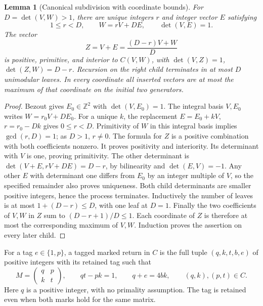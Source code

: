 \documentclass[11pt]{article}
\newtheorem{lemma}[theorem]{Lemma}
\theoremstyle{definition}\newtheorem{definition}[theorem]{Definition}
\theoremstyle{remark}\newtheorem{remark}[theorem]{Remark}
\newcommand{\Z}{\mathbb Z}\newcommand{\Q}{\mathbb Q}
\begin{document}
\begin{lemma}[Canonical subdivision with coordinate bounds]\label{lem:split}
For \(D=\det(V,W)>1\), there are unique integers \(r\) and
integer vector \(E\) satisfying
\[
 1\le r<D,\qquad W=rV+DE,\qquad\det(V,E)=1.
\]
The vector
\[
 Z=V+E=\frac{(D-r)V+W}{D}
\]
is positive, primitive, and interior to \(C(V,W)\), with
\(\det(V,Z)=1\), \(\det(Z,W)=D-r\).
Recursion on the right child terminates in at most \(D\)
unimodular leaves.  In every coordinate all inserted vectors
are at most the maximum of that coordinate on the initial
two generators.
\end{lemma}
\begin{proof}
Bezout gives \(E_0\in\Z^2\) with \(\det(V,E_0)=1\).
The integral basis \(V,E_0\) writes \(W=r_0 V+D E_0\).
For a unique \(k\), the replacement \(E=E_0+kV\),
\(r=r_0-Dk\) gives \(0\le r<D\).
Primitivity of \(W\) in this integral basis implies
\(\gcd(r,D)=1\); as \(D>1\), \(r\ne0\).
The formula for \(Z\) is a positive combination with both
coefficients nonzero.  It proves positivity and interiority.
Its determinant with \(V\) is one, proving primitivity.
The other determinant is
\(\det(V+E,rV+DE)=D-r\), by bilinearity and
\(\det(E,V)=-1\).
Any other \(E\) with determinant one differs from \(E_0\)
by an integer multiple of \(V\), so the specified remainder
also proves uniqueness.  Both child determinants are
smaller positive integers, hence the process terminates.
Inductively the number of leaves is at most
\(1+(D-r)\le D\), with one leaf at \(D=1\).
Finally the two coefficients of \(V,W\) in \(Z\) sum to
\((D-r+1)/D\le1\).  Each coordinate of \(Z\) is therefore
at most the corresponding maximum of \(V,W\).  Induction
proves the assertion on every later child.
\end{proof}

For a tag \(e\in\{1,p\}\), a tagged marked return in \(C\)
is the full tuple \((q,k,t,b,e)\) of positive integers
with its retained tag such that
\begin{equation}\label{eq:marked-return}
 M=\begin{pmatrix}q&p\\k&t\end{pmatrix},\qquad
 qt-pk=1,\qquad q+e=4bk,\qquad (q,k),(p,t)\in C .
\end{equation}
Here \(q\) is a positive integer, with no primality
assumption.  The tag is retained even when both marks
hold for the same matrix.
\end{document}
